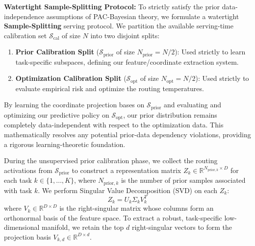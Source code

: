 \textbf{Watertight Sample-Splitting Protocol:} To strictly satisfy the prior data-independence assumptions of PAC-Bayesian theory, we formulate a watertight \textbf{Sample-Splitting} serving protocol. We partition the available serving-time calibration set $\mathcal{S}_{\text{cal}}$ of size $N$ into two disjoint splits:
\begin{enumerate}
    \item \textbf{Prior Calibration Split} ($\mathcal{S}_{\text{prior}}$ of size $N_{\text{prior}} = N/2$): Used strictly to learn task-specific subspaces, defining our feature/coordinate extraction system.
    \item \textbf{Optimization Calibration Split} ($\mathcal{S}_{\text{opt}}$ of size $N_{\text{opt}} = N/2$): Used strictly to evaluate empirical risk and optimize the routing temperatures.
\end{enumerate}
By learning the coordinate projection bases on $\mathcal{S}_{\text{prior}}$ and evaluating and optimizing our predictive policy on $\mathcal{S}_{\text{opt}}$, our prior distribution remains completely data-independent with respect to the optimization data. This mathematically resolves any potential prior-data dependency violations, providing a rigorous learning-theoretic foundation.

During the unsupervised prior calibration phase, we collect the routing activations from $\mathcal{S}_{\text{prior}}$ to construct a representation matrix $Z_k \in \mathbb{R}^{N_{\text{prior}, k} \times D}$ for each task $k \in \{1, \dots, K\}$, where $N_{\text{prior}, k}$ is the number of prior samples associated with task $k$. We perform Singular Value Decomposition (SVD) on each $Z_k$:
\begin{equation}
  Z_k = U_k \Sigma_k V_k^T
  \label{eq:svd}
\end{equation}
where $V_k \in \mathbb{R}^{D \times D}$ is the right-singular matrix whose columns form an orthonormal basis of the feature space. To extract a robust, task-specific low-dimensional manifold, we retain the top $d$ right-singular vectors to form the projection basis $V_{k, d} \in \mathbb{R}^{D \times d}$.

